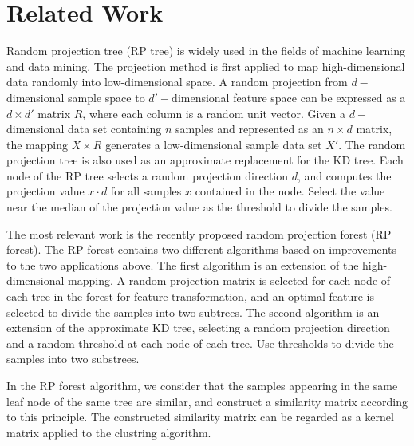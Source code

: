 \section{Related Work}
Random projection tree (RP tree) is widely used in the fields of machine learning and data mining. 
The projection method is first applied to map high-dimensional data randomly into low-dimensional space.
A random projection from $d-$dimensional sample space to $d'-$dimensional feature space can be expressed as a $d\times d'$ matrix $R$, where each column is a random unit vector. Given a $d-$dimensional data set containing $n$ samples and represented as an $n\times d$ matrix, the mapping $X\times R$ generates a low-dimensional sample data set $X'$.
The random projection tree is also used as an approximate replacement for the KD tree. Each node of the RP tree selects a random projection direction $d$, and computes the projection value $x\cdot d$ for all samples $x$ contained in the node. Select the value near the median of the projection value as the threshold to divide the samples. 

The most relevant work is the recently proposed random projection forest (RP forest).  The RP forest contains two different algorithms based on improvements to the two applications above. 
The first algorithm is an extension of the high-dimensional mapping. A random projection matrix is selected for each node of each tree in the forest for feature transformation, and an optimal feature is selected to divide the samples into two subtrees.
The second algorithm is an extension of the approximate KD tree, selecting a random projection direction and a random threshold at each node of each tree. Use thresholds to divide the samples into two substrees.

In the RP forest algorithm, we consider that the samples appearing in the same leaf node of the same tree are similar, and construct a similarity matrix according to this principle. The constructed similarity matrix can be regarded as a kernel matrix applied to the clustring algorithm.